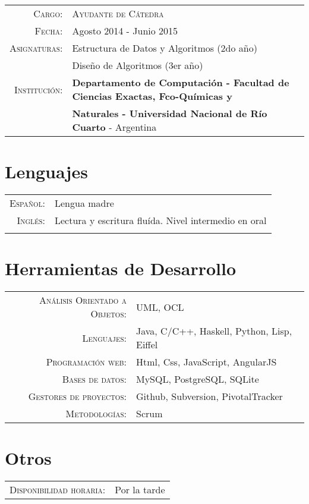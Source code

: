 \documentclass[a4paper,10pt]{article} %
\begin{document}
\begin{tabular}{rl}
\\


\textsc{Cargo:} & \textsc{Ayudante de Cátedra} \\
\textsc{Fecha:} & Agosto 2014 - Junio 2015 \\
\textsc{Asignaturas:} & Estructura de Datos y Algoritmos (2do año) \\ & Diseño de Algoritmos (3er año) \\
\textsc{Institución:} & \textbf{Departamento de Computación - Facultad de Ciencias Exactas, Fco-Químicas y} \\  
& \textbf{Naturales - Universidad Nacional de Río Cuarto} - Argentina \\ 

\end{tabular}


\section{Lenguajes}

\begin{tabular}{rl}
\\
\textsc{Español:} & Lengua madre\\
\textsc{Inglés:} & Lectura y escritura fluída. Nivel intermedio en oral \\ & \\

\end{tabular}


\section{Herramientas de Desarrollo}

\begin{tabular}{rl}
\\
\textsc{Análisis Orientado a Objetos}: & UML, OCL \\
\textsc{Lenguajes}: & Java, C/C++, Haskell, Python, Lisp, Eiffel \\
\textsc{Programación web}: & Html, Css, JavaScript, AngularJS \\
\textsc{Bases de datos}: & MySQL, PostgreSQL, SQLite \\
\textsc{Gestores de proyectos}: & Github, Subversion, PivotalTracker \\
\textsc{Metodologías}: & Scrum \\

\end{tabular}

\section{Otros}
\begin{tabular}{rl}
\textsc{Disponibilidad horaria}: & Por la tarde
\end{tabular}
\end{document}
